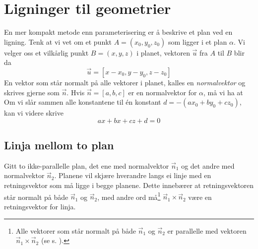 \section{Ligninger til geometrier}
En mer kompakt metode enn parameterisering er å beskrive et plan ved en ligning. 
Tenk at vi vet om et punkt $ {A=(x_0, y_0, z_0)} $ som ligger i et plan $ \alpha $. Vi velger oss et vilkårlig punkt $ {B=(x, y, z)}$ i planet, vektoren $ \vec{u} $ fra $ A $ til $ B $ blir da
\[ \vec{u}=[x-x_0, y-y_0, z-z_0] \]
En vektor som står normalt på alle vektorer i planet, kalles en \textit{normalvektor} og skrives gjerne som $ \vec{n} $. Hvis $ {\vec{n}=[a, b, c] }$ er en normalvektor for $ \alpha $, må vi ha at
Om vi slår sammen alle konstantene til én konstant $ d=-(ax_0+by_0+cz_0) $, kan vi videre skrive
\[ ax+bx+cz+d =0\]
\plaro
\plaroe
\newpage
\plroe
{}\vsk

\subsection{Linja mellom to plan}
Gitt to ikke-parallelle plan, det ene med normalvektor $ \vec{n}_1 $ og det andre med normalvektor $ \vec{n}_2 $. Planene vil skjære hverandre langs ei linje med en retningsvektor som må ligge i begge planene. Dette innebærer at retningsvektoren står normalt på både $ \vec{n}_1 $ og $ \vec{n}_2 $, med andre ord må\footnote{Alle vektorer som står normalt på både $ \vec{n}_1 $ og $ \vec{n}_2 $ er parallelle med vektoren $ \vec{n}_1\times\vec{n}_2 $ (se s. \pageref{allekrypropar}). } $ \vec{n}_1\times\vec{n}_2 $ være en retningsvektor for linja.

